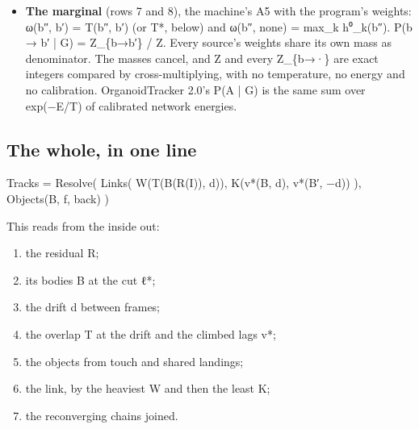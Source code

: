 \begin{itemize}
\begin{itemize}
\item pass 1: N = σ ∘ (S\_\allowbreak{}A m\_\allowbreak{}B − S\_\allowbreak{}B m\_\allowbreak{}A) per pair, where σ\_\allowbreak{}a = voxel\_\allowbreak{}pm\_\allowbreak{}a / gcd(voxel\_\allowbreak{}pm);
\item pass 2 reads two pass-1 records: dot = N · N′, c = COMPARE(dot + 1, 1) = sign(dot);
\item kept = c (c + 1) and crossed = c (c − 1).
\end{itemize}

dot is (c\_\allowbreak{}A − c\_\allowbreak{}B)·(c\_\allowbreak{}A′ − c\_\allowbreak{}B′) in physical space times the positive m\_\allowbreak{}A m\_\allowbreak{}B m\_\allowbreak{}A′ m\_\allowbreak{}B′ / gcd², and its sign is exact. Two membranes cannot pass through one another, and a real pair keeps its side. dot = 0 includes A′ = B′, the pair landing on one body.
\item \textbf{The marginal} (rows 7 and 8), the machine's A5 with the program's weights: ω(b″, b′) = T(b″, b′) (or T*, below) and ω(b″, none) = max\_\allowbreak{}k h⁰\_\allowbreak{}k(b″). P(b → b′ | G) = Z\_\allowbreak{}\{b→b′\} / Z. Every source's weights share its own mass as denominator. The masses cancel, and Z and every Z\_\allowbreak{}\{b→·\} are exact integers compared by cross-multiplying, with no temperature, no energy and no calibration. OrganoidTracker 2.0's P(A | G) is the same sum over exp(−E/T) of calibrated network energies.
\end{itemize}

\subsection{\texorpdfstring{The whole, in one line}{The whole, in one line}}

Tracks = Resolve( Links( W(T(B(R(I)), d)), K(v*(B, d), v*(B′, −d)) ), Objects(B, f, back) )

This reads from the inside out:

\begin{enumerate}
\item the residual R;
\item its bodies B at the cut ℓ*;
\item the drift d between frames;
\item the overlap T at the drift and the climbed lags v*;
\item the objects from touch and shared landings;
\item the link, by the heaviest W and then the least K;
\item the reconverging chains joined.
\end{enumerate}

